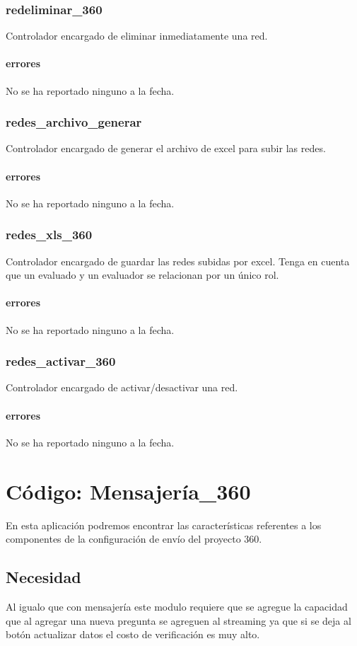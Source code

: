 \documentclass[10pt,a4paper]{book}
\begin{document}
	\subsection{redeliminar\_360}
	Controlador encargado de eliminar inmediatamente una red.
	\subsubsection{errores}
	No se ha reportado ninguno a la fecha.
	
	\subsection{redes\_archivo\_generar}
	Controlador encargado de generar el archivo de excel para subir las redes.
	\subsubsection{errores}
	No se ha reportado ninguno a la fecha.
	
	\subsection{redes\_xls\_360}
	Controlador encargado de guardar las redes subidas por excel. Tenga en cuenta que un evaluado y un evaluador se relacionan por un único rol.
	\subsubsection{errores}
	No se ha reportado ninguno a la fecha.
	
	\subsection{redes\_activar\_360}
	Controlador encargado de activar/desactivar una red.
	\subsubsection{errores}
	No se ha reportado ninguno a la fecha.


	\chapter{Código: Mensajería\_360}
	
	En esta aplicación podremos encontrar las características referentes a los componentes de la configuración de envío del proyecto 360.
	
	\section{Necesidad}
	Al igualo que con mensajería este modulo requiere que se agregue la capacidad que al agregar una nueva pregunta se agreguen al streaming ya que si se deja al botón actualizar datos el costo de verificación es muy alto.
	
\end{document}
